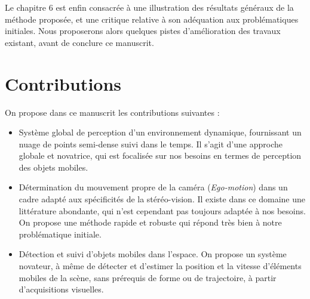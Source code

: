 Le chapitre 6 est enfin consacrée à une illustration des résultats généraux de la méthode proposée, et une critique relative à son adéquation aux problématiques initiales. Nous proposerons alors quelques pistes d'amélioration des travaux existant, avant de conclure ce manuscrit.

\section{Contributions}
On propose dans ce manuscrit les contributions suivantes :
\begin{itemize}
\item Système global de perception d'un environnement dynamique, fournissant un nuage de points semi-dense suivi dans le temps. Il s'agit d'une approche globale et novatrice, qui est focalisée sur nos besoins en termes de perception des objets mobiles.\\

\item Détermination du mouvement propre de la caméra (\emph{Ego-motion}) dans un cadre adapté aux spécificités de la stéréo-vision. Il existe dans ce domaine une littérature abondante, qui n'est cependant pas toujours adaptée à nos besoins. On propose une méthode rapide et robuste qui répond très bien à notre problématique initiale.\\

\item Détection et suivi d'objets mobiles dans l'espace. On propose un système novateur, à même de détecter et d'estimer la position et la vitesse d'éléments mobiles de la scène, sans prérequis de forme ou de trajectoire, à partir d'acquisitions visuelles.
\end{itemize}